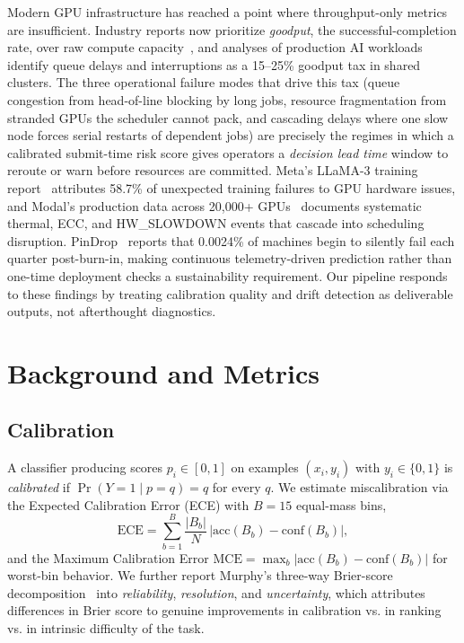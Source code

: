 \documentclass[conference]{IEEEtran}
\begin{document}
Modern GPU infrastructure has reached a point where throughput-only metrics are insufficient. Industry reports now prioritize \emph{goodput}, the successful-completion rate, over raw compute capacity~\cite{coreweave2025}, and analyses of production AI workloads identify queue delays and interruptions as a 15--25\% goodput tax in shared clusters. The three operational failure modes that drive this tax (queue congestion from head-of-line blocking by long jobs, resource fragmentation from stranded GPUs the scheduler cannot pack, and cascading delays where one slow node forces serial restarts of dependent jobs) are precisely the regimes in which a calibrated submit-time risk score gives operators a \emph{decision lead time} window to reroute or warn before resources are committed. Meta's LLaMA-3 training report~\cite{llama3} attributes 58.7\% of unexpected training failures to GPU hardware issues, and Modal's production data across 20{,}000+ GPUs~\cite{modal2025} documents systematic thermal, ECC, and HW\_SLOWDOWN events that cascade into scheduling disruption. PinDrop~\cite{pindrop2026} reports that 0.0024\% of machines begin to silently fail each quarter post-burn-in, making continuous telemetry-driven prediction rather than one-time deployment checks a sustainability requirement. Our pipeline responds to these findings by treating calibration quality and drift detection as deliverable outputs, not afterthought diagnostics.

\section{Background and Metrics}
\label{sec:bg}
\subsection{Calibration}
A classifier producing scores $p_i \in [0,1]$ on examples $(x_i, y_i)$ with $y_i \in \{0,1\}$ is \emph{calibrated} if $\Pr(Y = 1 \mid p = q) = q$ for every $q$. We estimate miscalibration via the Expected Calibration Error (ECE) with $B=15$ equal-mass bins,
\begin{equation}
\mathrm{ECE} = \sum_{b=1}^{B} \frac{|B_b|}{N}\, \left| \mathrm{acc}(B_b) - \mathrm{conf}(B_b) \right|,
\end{equation}
and the Maximum Calibration Error $\mathrm{MCE} = \max_b |\mathrm{acc}(B_b) - \mathrm{conf}(B_b)|$ for worst-bin behavior. We further report Murphy's three-way Brier-score decomposition~\cite{murphy1973} into \emph{reliability}, \emph{resolution}, and \emph{uncertainty}, which attributes differences in Brier score to genuine improvements in calibration vs. in ranking vs. in intrinsic difficulty of the task.
\end{document}
